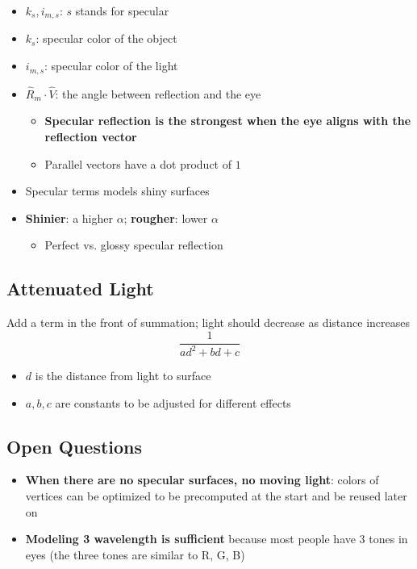     \begin{itemize}
      \item $ k_{s}, i_{m, s} $: $ s $ stands for specular
      \item $ k_{s} $: specular color of the object
      \item $ i_{m, s} $: specular color of the light
      \item $ \hat{R}_{m} \cdot \hat{V} $: the angle between reflection and
      the eye
      \begin{itemize}
        \item \textbf{Specular reflection is the strongest when the eye aligns
        with the reflection vector}
        \item Parallel vectors have a dot product of $ 1 $
      \end{itemize}

      \item Specular terms models shiny surfaces
      \item \textbf{Shinier}: a higher $ \alpha $; \textbf{rougher}:
      lower $ \alpha $
      \begin{itemize}
        \item Perfect vs. glossy specular reflection
      \end{itemize}
    \end{itemize}

\subsection{Attenuated Light}

    Add a term in the front of summation; light should decrease as distance
    increases
    \begin{equation*}
      \frac{1}{ad^{2} + bd + c}
    \end{equation*}

    \begin{itemize}
      \item $ d $ is the distance from light to surface
      \item $ a, b, c $ are constants to be adjusted for different effects
    \end{itemize}

\subsection{Open Questions}

  \begin{itemize}
    \item \textbf{When there are no specular surfaces, no moving light}:
    colors of vertices can be optimized to be precomputed at the start and
    be reused later on

    \item \textbf{Modeling 3 wavelength is sufficient} because most people
    have 3 tones in eyes (the three tones are similar to R, G, B)
  \end{itemize}


